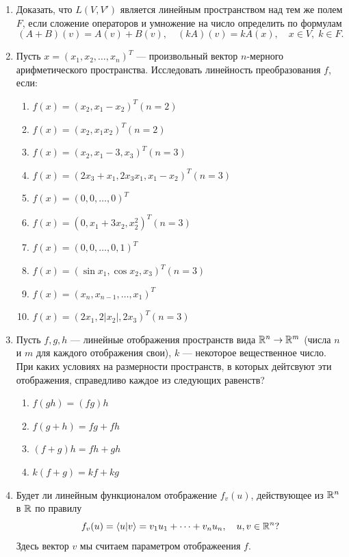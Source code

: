 \begin{enumerate}
\item Доказать, что $L(V,V')$ является линейным пространством над тем же полем $F$, если сложение операторов и умножение на число определить по формулам
$$
(A+B)(v) = A(v)+B(v),\quad (kA)(v) = kA(x),\quad x\in V,\; k\in F.
$$

\item  Пусть $x = (x_1, x_2, \dots, x_n)^T$ --- произвольный вектор $n$-мерного
арифметического пространства. Исследовать линейность преобразования $f$, если:
\begin{enumerate}
\item $f(x) = (x_2, x_1 - x_2)^T (n = 2)$
\item $f(x) = (x_2, x_1 x_2)^T (n = 2)$
\item $f(x) = (x_2, x_1 - 3, x_3)^T (n = 3)$
\item $f(x) = (2x_3 + x_1, 2x_3 x_1, x_1 - x_2)^T (n = 3)$
\item $f(x) = (0, 0, \dots , 0)^T$
\item $f(x) = (0, x_1 + 3x_2, x_2^2)^T (n = 3)$
\item $f(x) = (0, 0, \dots, 0, 1)^T$
\item $f(x) = (\sin x_1, \cos x_2, x_3)^T (n = 3)$
\item $f(x) = (x_n, x_{n-1}, \dots, x_1)^T$
\item $f(x) = (2x_1, 2|x_2|, 2x_3)^T (n = 3)$
\end{enumerate}

\item Пусть $f, g, h$ --- линейные отображения пространств вида $\mathbb R^n\to\mathbb R^m$ (числа $n$ и $m$ для каждого отображения свои), $k$ --- некоторое вещественное число.
При каких условиях на размерности пространств, в которых дейтсвуют эти отображения, справедливо каждое из следующих равенств?
\begin{enumerate}
\item $f(gh) = (fg)h$
\item $f(g + h) = fg + fh$
\item $(f + g)h = fh + gh$
\item $k(f + g) = kf + kg$
\end{enumerate}

\item Будет ли линейным функционалом отображение $f_v(u)$, действующее из $\mathbb R^n$ в $\mathbb R$ по правилу
$$
f_v(u)= \langle u|v\rangle = v_1u_1+\dots+v_nu_n,\quad u,v\in \mathbb R^n?
$$
Здесь вектор $v$ мы считаем параметром отображеения $f$.

\end{enumerate}



